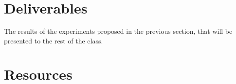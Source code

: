 \section{Deliverables}

The results of the experiments proposed in the previous section, that
will be presented to the rest of the class.


\section{Resources}


